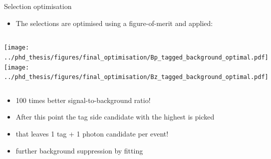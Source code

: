 \documentclass[xcolor=dvipsnames]{beamer}
\begin{document}
\begin{frame}{Selection optimisation}
\centering\scriptsize

\begin{itemize}
   \item The selections are optimised using a figure-of-merit and applied:
\end{itemize}

\vspace{5pt}

\begin{columns}
   \centering
   \texttt{[image: ../phd\_thesis/figures/final\_optimisation/Bp\_tagged\_background\_optimal.pdf]}
   \centering
   \texttt{[image: ../phd\_thesis/figures/final\_optimisation/Bz\_tagged\_background\_optimal.pdf]}
\end{columns}

\begin{itemize}
   \item[\ra] 100 times better signal-to-background ratio!
   \item After this point the tag side candidate with the highest \feiProb is picked
   \item[\ra] that leaves 1 tag + 1 photon candidate per event!
   \item[\ra] further background suppression by fitting
\end{itemize}

\end{frame}
\end{document}
